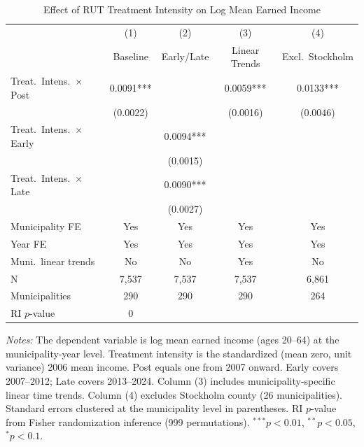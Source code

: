 \begin{table}[htbp]
\centering
\caption{Effect of RUT Treatment Intensity on Log Mean Earned Income}
\label{tab:main}
\begin{tabular}{lcccc}
\hline\hline
 & (1) & (2) & (3) & (4) \\
 & Baseline & Early/Late & Linear Trends & Excl.\ Stockholm \\
\hline
Treat.\ Intens.\ $\times$ Post & 0.0091*** & & 0.0059*** & 0.0133*** \\
 & (0.0022) & & (0.0016) & (0.0046) \\
Treat.\ Intens.\ $\times$ Early & & 0.0094*** & & \\
 & & (0.0015) & & \\
Treat.\ Intens.\ $\times$ Late & & 0.0090*** & & \\
 & & (0.0027) & & \\
\hline
Municipality FE & Yes & Yes & Yes & Yes \\
Year FE & Yes & Yes & Yes & Yes \\
Muni.\ linear trends & No & No & Yes & No \\
N & 7,537 & 7,537 & 7,537 & 6,861 \\
Municipalities & 290 & 290 & 290 & 264 \\
RI $p$-value & 0 & & & \\
\hline\hline
\end{tabular}
\begin{minipage}{0.95\textwidth}
\vspace{0.3em}\footnotesize
\textit{Notes:} The dependent variable is log mean earned income (ages 20--64) at the municipality-year level. Treatment intensity is the standardized (mean zero, unit variance) 2006 mean income. Post equals one from 2007 onward. Early covers 2007--2012; Late covers 2013--2024. Column (3) includes municipality-specific linear time trends. Column (4) excludes Stockholm county (26 municipalities). Standard errors clustered at the municipality level in parentheses. RI $p$-value from Fisher randomization inference (999 permutations). $^{***}p<0.01$, $^{**}p<0.05$, $^{*}p<0.1$.
\end{minipage}
\end{table}

